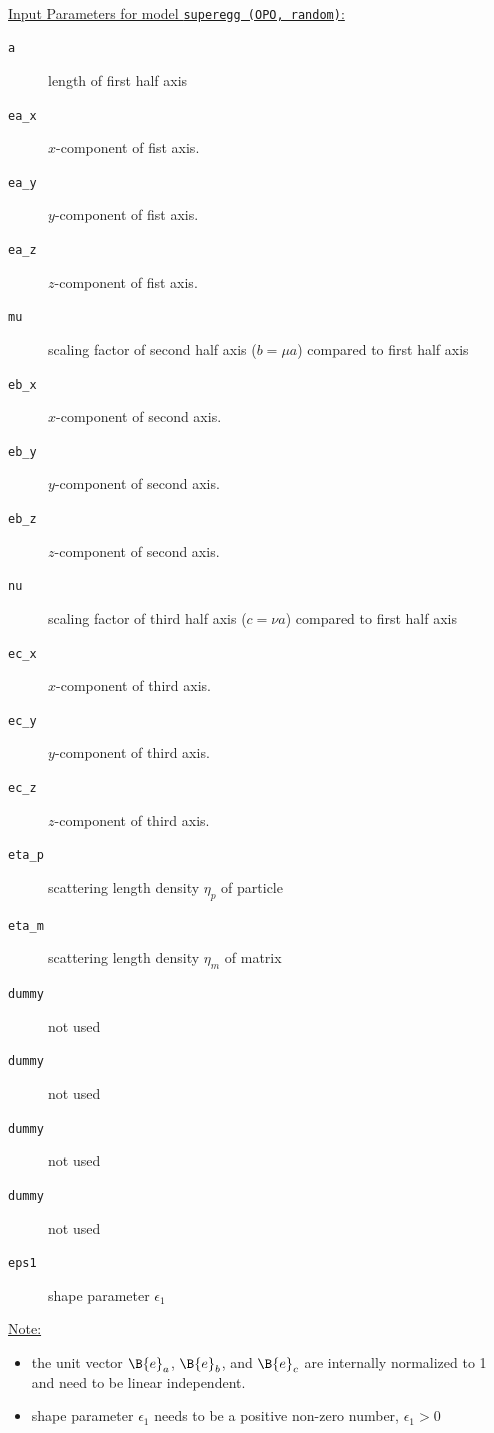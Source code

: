 ~\\
\underline{Input Parameters for model \texttt{superegg (OPO, random)}:}
\begin{description}
\item[\texttt{a}] length of first half axis
\item[\texttt{ea\_x}] $x$-component of fist axis.
\item[\texttt{ea\_y}] $y$-component of fist axis.
\item[\texttt{ea\_z}] $z$-component of fist axis.
\item[\texttt{mu}] scaling factor of second half axis ($b=\mu a$) compared to first half axis
\item[\texttt{eb\_x}] $x$-component of second axis.
\item[\texttt{eb\_y}] $y$-component of second axis.
\item[\texttt{eb\_z}] $z$-component of second axis.
\item[\texttt{nu}] scaling factor of third half axis ($c=\nu a$) compared to first half axis
\item[\texttt{ec\_x}] $x$-component of third axis.
\item[\texttt{ec\_y}] $y$-component of third axis.
\item[\texttt{ec\_z}] $z$-component of third axis.
\item[\texttt{eta\_p}] scattering length density $\eta_p$ of particle
\item[\texttt{eta\_m}] scattering length density $\eta_m$ of matrix
\item[\texttt{dummy}] not used
\item[\texttt{dummy}] not used
\item[\texttt{dummy}] not used
\item[\texttt{dummy}] not used
\item[\texttt{eps1}] shape parameter $\epsilon_1$
\end{description}

\noindent\underline{Note:}
\begin{itemize}
\item the unit vector $\B{e}_a$, $\B{e}_b$, and $\B{e}_c$ are internally normalized to 1 and need to be linear independent.
\item shape parameter $\epsilon_1$ needs to be a positive non-zero number, $\epsilon_1>0$ 
\end{itemize}

\clearpage
